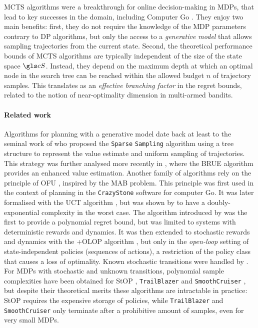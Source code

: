 \gls{MCTS} algorithms were a breakthrough for online decision-making in \glspl{MDP}, that lead to key successes in the domain, including Computer Go \citep{Coulom2006,Silver2018}. They enjoy two main benefits: first, they do not require the knowledge of the \gls{MDP} parameters contrary to \eg \gls{DP} algorithms, but only the access to a \emph{generative model} that allows sampling trajectories from the current state. Second, the theoretical performance bounds of \gls{MCTS} algorithms are typically independent of the size of the state space $\cS$. Instead, they depend on the maximum depth at which an optimal node in the search tree can be reached within the allowed budget $n$ of trajectory samples. This translates as an \emph{effective branching factor} in the regret bounds, related to the notion of near-optimality dimension in multi-armed bandits.

\paragraph{Related work}
Algorithms for planning with a generative model date back at least to the seminal work of \citet{Kearns02SS} who proposed the \texttt{Sparse} \texttt{Sampling} algorithm using a tree structure to represent the value estimate and uniform sampling of trajectories. This strategy was further analysed more recently in \citep{Feldman14BRUE}, where the \gls{BRUE} algorithm provides an enhanced value estimation. Another family of algorithms rely on the principle of \gls*{OFU} \citep[surveyed by][]{Munos2014}, inspired by the \gls*{MAB} problem. This principle was first used in the context of planning in the \texttt{CrazyStone} software \citep{Coulom2006} for computer Go. It was later formalised with the \gls{UCT} algorithm \citep{Kocsis2006}, but was shown by \citet{Coquelin2007} to have a doubly-exponential complexity in the worst case. The \OPD algorithm introduced by \citet{Hren2008} was the first to provide a polynomial regret bound, but was limited to systems with deterministic rewards and dynamics. It was then extended to stochastic rewards and dynamics with the \glsxtrfull+{OLOP} algorithm \citep{Bubeck2010}, but only in the \emph{open-loop} setting of state-independent policies (\ie sequences of actions), a restriction of the policy class that causes a loss of optimality.
Known stochastic transitions were handled by \citet{Busoniu2012optimistic}. For \glspl{MDP} with stochastic and unknown transitions, polynomial sample complexities have been obtained for \gls{StOP} \citep{Szorenyi2014}, \texttt{TrailBlazer} \citep{Grill2016} and \texttt{SmoothCruiser} \citep{Grill2019}, but despite their theoretical merits these algorithms are intractable in practice: \gls{StOP} requires the expensive storage of policies, while \texttt{TrailBlazer} and \texttt{SmoothCruiser} only terminate after a prohibitive amount of samples, even for very small \glspl{MDP}. %

